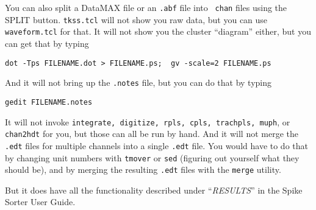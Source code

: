\documentclass{article}
\begin{document}
You can also split a DataMAX file or an {\tt .abf} file into {\tt
  chan} files using the SPLIT button.  {\tt tkss.tcl} will not show you
raw data, but you can use {\tt waveform.tcl} for that.  It will not
show you the cluster ``diagram'' either, but you can get that by
typing
\begin{verbatim}
dot -Tps FILENAME.dot > FILENAME.ps;  gv -scale=2 FILENAME.ps
\end{verbatim}
And it will not bring up the {\tt .notes} file, but you can do that by
typing
\begin{verbatim}
gedit FILENAME.notes
\end{verbatim}
It will not invoke {\tt integrate, digitize, rpls, cpls, trachpls,
  muph}, or {\tt chan2hdt} for you, but those can all be run by hand.
And it will not merge the {\tt .edt} files for multiple channels into
a single {\tt .edt} file.  You would have to do that by changing unit
numbers with {\tt tmover} or {\tt sed} (figuring out yourself what
they should be), and by merging the resulting {\tt .edt} files with
the {\tt merge} utility.

But it does have all the functionality described under
``\textit{RESULTS}'' in the Spike Sorter User Guide.

\clearpage
\end{document}
